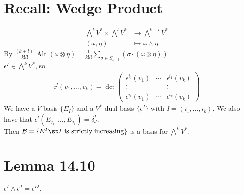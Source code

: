 \documentclass[11pt]{article}
\begin{document}
\section*{Recall: Wedge Product}
\label{sec:org3d44519}
\begin{align*}
  \bigwedge^{k}V^{*}\times\bigwedge^{l}V^{*}
  &\to\bigwedge^{k+l}V^{*} \\
  (\omega,\eta)
  &\mapsto \omega\wedge\eta
\end{align*}
By \(\frac{(k+l)!}{k!l!}\operatorname{Alt}(\omega\otimes\eta)=\frac{1}{k!l!}\sum_{\sigma\in S_{k+l}}(\sigma\cdot(\omega\otimes\eta))\).\\
\(\epsilon^{I}\in\bigwedge^{k}V^{*}\), so\\
\begin{align*}
  \epsilon^{I}(v_{1},\ldots,v_{k})=\det
  \begin{pmatrix}
    \epsilon^{i_{1}}(v_{1}) & \cdots & \epsilon^{i_{1}}(v_{k}) \\
    \vdots & & \vdots \\
    \epsilon^{i_{k}}(v_{1}) & \cdots & \epsilon^{i_{k}}(v_{k})
  \end{pmatrix}
\end{align*}
We have a \(V\) basis \(\{E_{I}\}\) and a \(V^{*}\) dual basis \(\{\epsilon^{I}\}\) with \(I=(i_{1},\ldots,i_{k})\). We also have that \(\epsilon^{I}(E_{j_{1}},\ldots,E_{j_{k}})=\delta^{I}_{J}\).\\
Then \(\mathcal{B}=\{E^{I}\st I\text{ is strictly increasing}\}\) is a basis for \(\bigwedge^{k}V^{*}\).\\
\section*{Lemma 14.10}
\label{sec:orgdb9ab97}
\(\epsilon^{I}\wedge\epsilon^{J}=\epsilon^{IJ}\).\\
\end{document}
